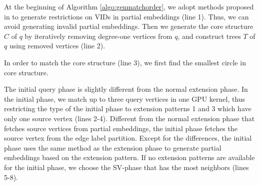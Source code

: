 

 At the beginning of Algorithm \ref{algo:genmatchorder}, we adopt methods proposed in \cite{shi2020graphpi,mawhirter2019graphzero} to generate restrictions on VIDs in partial embeddings (line 1). Thus, we can avoid generating invalid partial embeddings. Then we generate the core structure $C$ of $q$ by iteratively removing degree-one vertices from $q$, and construct trees $T$ of $q$ using removed vertices (line 2).

In order to match the core structure (line 3), we first find the smallest circle in core structure.

The initial query phase is slightly different from the normal extension phase. In the initial phase, we match up to three query vertices in one GPU kernel, thus restricting the type of the initial phase to extension patterns 1 and 3 which have only one source vertex (lines 2-4). Different from the normal extension phase that fetches source vertices from partial embeddings, the initial phase fetches the source vertex from the edge label partition. Except for the differences, the initial phase uses the same method as the extension phase to generate partial embeddings based on the extension pattern. If no extension patterns are available for the initial phase, we choose the SV-phase that has the most neighbors (lines 5-8).

